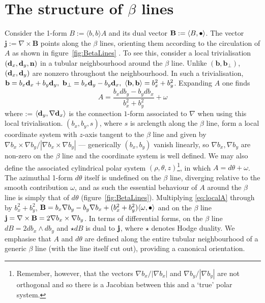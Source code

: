 \section{The structure of $\beta$ lines}
\label{sec:BendStructure}
Consider the 1-form $B := \langle b,b \rangle A$ and its dual vector $\mathbf{B} := \langle B, \bullet \rangle$. The vector $\mathbf{j} := \nabla \times \mathbf{B}$ points along the $\beta$ lines, orienting them according to the circulation of $A$ as shown in figure~\ref{fig:BetaLines} \citep{Machon2016b}. To see this, consider a local trivialisation $(\mathbf{d}_x, \mathbf{d}_y,\mathbf{n})$ in a tubular neighbourhood around the $\beta$ line. Unlike $(\mathbf{b}, \mathbf{b}_\perp)$, $(\mathbf{d}_x, \mathbf{d}_y)$ are nonzero throughout the neighbourhood. In such a trivialisation, ${\bf b} = b_x \mathbf{d}_x + b_y \mathbf{d}_y,\ {\bf b}_\perp = b_x \mathbf{d}_y - b_y \mathbf{d}_x,\ \langle \mathbf{b}, \mathbf{b} \rangle = b_x^2 + b_y^2$. Expanding $A$ one finds
\begin{equation}
    A = \frac{b_x d b_y - b_y d b_x}{b_x^2 + b_y^2}+ \omega
    \label{eq:localA}
\end{equation}
where \omega := $\langle \mathbf{d}_y, \nabla \mathbf{d}_x \rangle$ is the connection $1$-form associated to $\nabla$ when using this local trivialisation. $(b_x,b_y,s)$, where $s$ is arclength along the $\beta$ line, form a local coordinate system with $z$-axis tangent to the $\beta$ line and given by $\nabla b_x \times \nabla b_y/|\nabla b_x \times \nabla b_y|$ --- generically $(b_x, b_y)$ vanish linearly, so $\nabla b_x, \nabla b_y$ are non-zero on the $\beta$ line and the coordinate system is well defined. We may also define the associated cylindrical polar system $(\rho,\theta,z)$\footnote{Remember, however, that the vectors $\nabla b_x/|\nabla b_x|$ and $\nabla b_y/|\nabla b_y|$ are not orthogonal and so there is a Jacobian between this and a `true' polar system.}, in which $A = d\theta + \omega$. The azimuthal 1-form $d\theta$ itself is undefined on the $\beta$ line, diverging relative to the smooth contribution $\omega$, and as such the essential behaviour of $A$ around the $\beta$ line is simply that of $d \theta$ (figure~\ref{fig:BetaLines}). Multiplying \eqref{eq:localA} through by $b_x^2 + b_y^2$, $\mathbf{B} = b_x \nabla b_y - b_y \nabla b_x + (b_x^2 + b_y^2) \langle \omega, \bullet \rangle$  and on the $\beta$ line $\mathbf{j} = \nabla \times \mathbf{B} = 2 \nabla b_x \times \nabla b_y$. In terms of differential forms, on the $\beta$ line $dB = 2 d b_x \wedge d b_y$ and $\star dB$ is dual to $\mathbf{j}$, where $\star$ denotes Hodge duality. We emphasise that $A$ and $d\theta$ are defined along the entire tubular neighbourhood of a generic $\beta$ line (with the line itself cut out), providing a canonical orientation.
